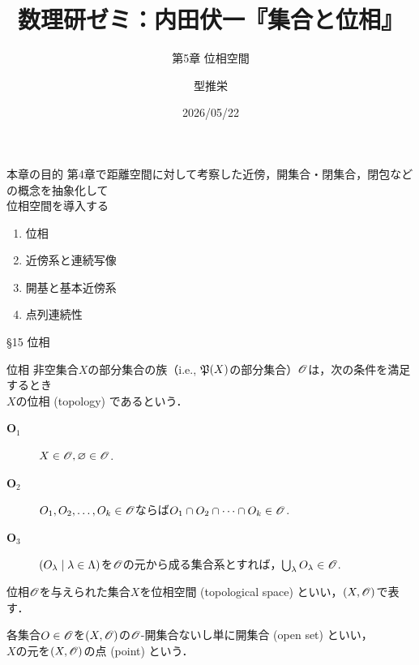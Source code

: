 \documentclass[uplatex,a4paper,dvipdfmx,aspectratio=169,11pt]{beamer}
\title[内田集合位相ゼミ2]{数理研ゼミ：内田伏一『集合と位相』}
\subtitle{第5章 位相空間}
\author{型推栄}
\institute[M1]{大学院情報理工学研究科 I専攻 岡本吉央研究室 M1}
\date{2026/05/22}
\begin{document}
\begin{frame}
    \titlepage
\end{frame}


\begin{frame}[fragile]{本章の目的}
    第4章で距離空間に対して考察した近傍，開集合・閉集合，閉包などの概念を抽象化して\\\alert{位相空間}を導入する

    \bigskip

    \begin{enumerate}
        \item[\S 15] 位相
        \item[\S 16] 近傍系と連続写像
        \item[\S 17] 開基と基本近傍系
        \item[\S 18] 点列連続性
    \end{enumerate}

\end{frame}


\begin{frame}[fragile]{\S 15 位相}
    \begin{block}{位相}
        非空集合$X$の部分集合の族（i.e., $\mathord{\mathfrak{P}}\qty(X)$の部分集合）$\mathscr{O}$は，次の条件を満足するとき\\$X$の\alert{位相} (topology) であるという．
       \begin{description}
           \item[$\textbf{O}_1$] $X \in \mathscr{O}, \varnothing \in \mathscr{O}$.
           \item[$\textbf{O}_2$] $O_1, O_2, \ldots, O_k \in \mathscr{O}$ならば$O_1 \cap O_2 \cap \dots \cap O_k \in \mathscr{O}$.
           \item[$\textbf{O}_3$] $\qty(O_\lambda \mid \lambda \in \Lambda)$を$\mathscr{O}$の元から成る集合系とすれば，$\bigcup_\lambda O_\lambda \in \mathscr{O}$.
       \end{description} 
    \end{block}

    \medskip{}

    位相$\mathscr{O}$を与えられた集合$X$を\alert{位相空間} (topological space) といい，$(X, \mathscr{O})$で表す．

    各集合$O \in \mathscr{O}$を$(X, \mathscr{O})$の\alert{$\mathscr{O}$-開集合}ないし単に\alert{開集合} (open set) といい，\\
    $X$の元を$(X, \mathscr{O})$の\alert{点} (point) という．
\end{frame}
\end{document}
